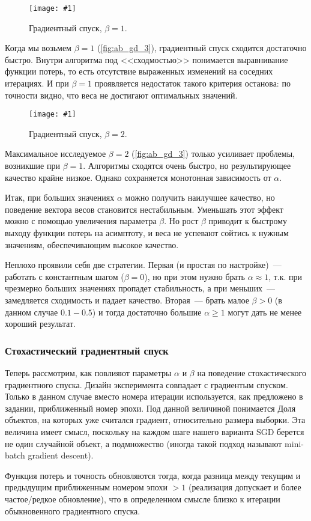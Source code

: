 \documentclass[12pt]{article}
\newcommand{\mpl}[2]{
    \begin{figure}[!h]
        \texttt{[image: \#1]}
        \centering
        \caption{#2}
        \label{fig:#1}
     \end{figure}
}
\begin{document}
\mpl{ab_gd_3}{Градиентный спуск, $\beta=1$.}
Когда мы возьмем $\beta=1$ (\autoref{fig:ab_gd_3}), градиентный спуск сходится достаточно быстро. Внутри алгоритма под <<сходмостью>> понимается выравнивание функции потерь, то есть отсутствие выраженных изменений на соседних итерациях. И при $\beta=1$ проявляется недостаток такого критерия останова: по точности видно, что веса не достигают оптимальных значений.

\mpl{ab_gd_4}{Градиентный спуск, $\beta=2$.}
Максимальное исследуемое $\beta=2$ (\autoref{fig:ab_gd_3}) только усиливает проблемы, возникшие при $\beta=1$. Алгоритмы сходятся очень быстро, но результирующее качество крайне низкое. Однако сохраняется монотонная зависимость от $\alpha$.

Итак, при больших значениях $\alpha$ можно получить наилучшее качество, но поведение вектора весов становится нестабильным. Уменьшать этот эффект можно с помощью увеличения параметра $\beta$. Но рост $\beta$ приводит к быстрому выходу функции потерь на асимптоту, и веса не успевают сойтись к нужным значениям, обеспечивающим высокое качество.

Неплохо проявили себя две стратегии. Первая (и простая по настройке)~--- работать с константным шагом ($\beta=0$), но при этом нужно брать $\alpha\approx1$, т.к. при чрезмерно больших значениях пропадет стабильность, а при меньших~--- замедляется сходимость и падает качество. Вторая~--- брать малое $\beta>0$ (в данном случае $0.1-0.5$) и тогда достаточно большие $\alpha\geqslant1$ могут дать не менее хороший результат.

\subsubsection{Стохастический градиентный спуск}
Теперь рассмотрим, как повлияют параметры $\alpha$ и $\beta$ на поведение стохастического градиентного спуска. Дизайн эксперимента совпадает с градиентым спуском. Только в данном случае вместо номера итерации используется, как предложено в задании, приближенный номер эпохи. Под данной величиной понимается Доля объектов, на которых уже считался градиент, относительно размера выборки. Эта величина имеет смысл, поскольку на каждом шаге нашего варианта SGD берется не один случайной объект, а подмножество (иногда такой подход называют mini-batch gradient descent).

Функция потерь и точность обновляются тогда, когда разница между текущим и предыдущим приближенным номером эпохи $>1$ (реализация допускает и более частое/редкое обновление), что в определенном смысле близко к итерации обыкновенного градиентного спуска.
\end{document}
